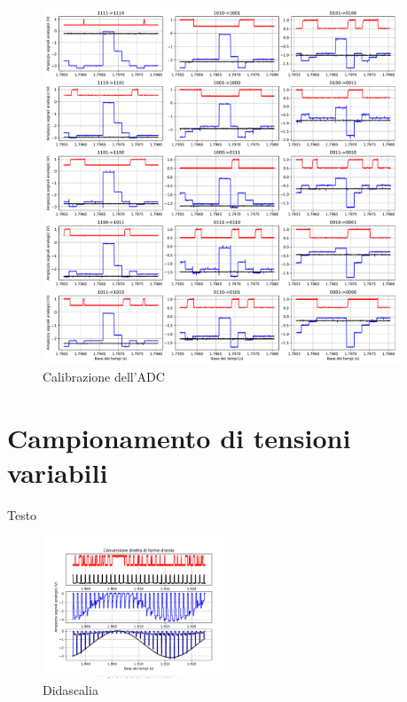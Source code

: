 \documentclass[journal]{IEEEtran}
\begin{document}
\begin{figure}[t]%
\centering
\includegraphics[trim = {30 0 50 0}, width=0.95\textwidth]{analysis/output/calibration.pdf}
\caption{Calibrazione dell'ADC}
\label{fig:waveforms_no_sh_scope}
\end{figure}

\section{Campionamento di tensioni variabili}
Testo

\begin{figure}[H]%
\begin{center}
\includegraphics[trim = {0 25 0 0},clip, width=0.50\textwidth]{analysis/output/direct_aq_waveforms.pdf}
\caption{Didascalia}
\label{fig:circuit_DAC}
\end{center}
\end{figure}
\end{document}
